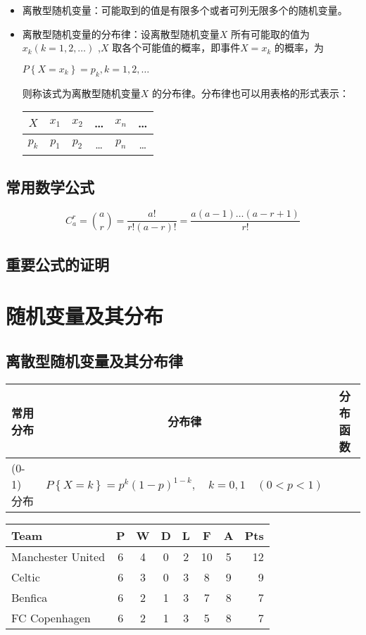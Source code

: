 \documentclass[11pt]{book}
\newcounter{#2}
\newcounter{#2}[#1]
\numberwithin{#2}{#1}
\begin{document}
\begin{itemize}
		\item 离散型随机变量：可能取到的值是有限多个或者可列无限多个的随机变量。
		\item 离散型随机变量的分布律：设离散型随机变量$ X $ 所有可能取的值为$ x_k(k=1, 2, \dots)$ ,$ X $ 取各个可能值的概率，即事件$ {X=x_k} $ 的概率，为
		\begin{center}
			$ P\left\{X=x_k\right\}=p_k, k=1, 2, \dots $
		\end{center}
		则称该式为离散型随机变量$ X $ 的分布律。分布律也可以用表格的形式表示：
		\begin{center}
			\begin{tabular}{|c|c|c|c|c|c|}
				\hline
				$ X $ & $ x_1 $ & $ x_2 $ & \dots & $ x_n $ & \dots \\
				\hline 
				$ p_k $ & $ p_1 $ & $ p_2 $ & \dots & $ p_n $ & \dots \\
				\hline
			\end{tabular}
		\end{center}
	\end{itemize}

	\section{常用数学公式}
		\begin{equation}
			C_a ^r =\binom{a}{r}=\frac{a!}{r!(a-r)!}=\frac{a(a-1)\dots (a-r+1)}{r!}
		\end{equation}
	\section{重要公式的证明}
	\chapter{随机变量及其分布}
	\section{离散型随机变量及其分布律}
	\begin{tabular}{|l|c|c|}
		\hline
		常用分布 & 分布律 & 分布函数 \\
		\hline
		(0-1) 分布 & $
		P\left\lbrace X=k\right\rbrace =p^k\left( 1-p\right) ^{1-k},\hspace{1em}k=0,1 \hspace{1em}\left( 0<p<1\right) 
		$ & \\
		\hline
	\end{tabular}

\begin{tabular}{l*{6}{c}r}
	Team              & P & W & D & L & F  & A & Pts \\
	\hline
	Manchester United & 6 & 4 & 0 & 2 & 10 & 5 & 12  \\
	Celtic            & 6 & 3 & 0 & 3 &  8 & 9 &  9  \\
	Benfica           & 6 & 2 & 1 & 3 &  7 & 8 &  7  \\
	FC Copenhagen     & 6 & 2 & 1 & 3 &  5 & 8 &  7  \\
\end{tabular}
 
\end{document}
